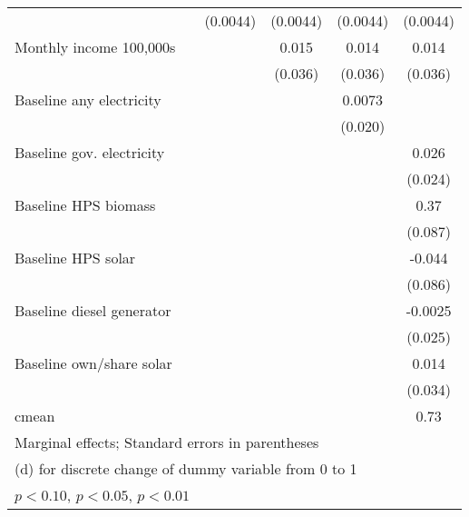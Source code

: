 \begin{table}[htbp]
\begin{tabular*}{1\hsize}{@{\hskip\tabcolsep\extracolsep\fill}l*{5}{c}}
                &                  & (0.0044)         & (0.0044)         & (0.0044)         & (0.0044)         \\
Monthly income 100,000s&                  &                  &    0.015         &    0.014         &    0.014         \\
                &                  &                  &  (0.036)         &  (0.036)         &  (0.036)         \\
Baseline any electricity&                  &                  &                  &   0.0073         &                  \\
                &                  &                  &                  &  (0.020)         &                  \\
Baseline gov. electricity&                  &                  &                  &                  &    0.026         \\
                &                  &                  &                  &                  &  (0.024)         \\
Baseline HPS biomass&                  &                  &                  &                  &     0.37\sym{***}\\
                &                  &                  &                  &                  &  (0.087)         \\
Baseline HPS solar&                  &                  &                  &                  &   -0.044         \\
                &                  &                  &                  &                  &  (0.086)         \\
Baseline diesel generator&                  &                  &                  &                  &  -0.0025         \\
                &                  &                  &                  &                  &  (0.025)         \\
Baseline own/share solar&                  &                  &                  &                  &    0.014         \\
                &                  &                  &                  &                  &  (0.034)         \\
\midrule
cmean           &                  &                  &                  &                  &     0.73         \\
\bottomrule
\multicolumn{6}{l}{\footnotesize Marginal effects; Standard errors in parentheses}\\
\multicolumn{6}{l}{\footnotesize  (d) for discrete change of dummy variable from 0 to 1}\\
\multicolumn{6}{l}{\footnotesize \sym{*} \(p<0.10\), \sym{**} \(p<0.05\), \sym{***} \(p<0.01\)}\\
\end{tabular*}
\end{table}
